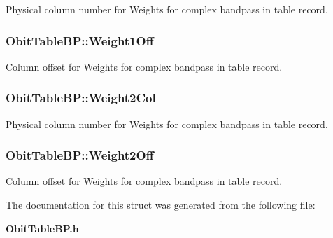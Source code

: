 Physical column number for Weights for complex bandpass in table record. 

\subsubsection{ {\bf Obit\-Table\-BP::Weight1Off}}\label{structObitTableBP_o42}


Column offset for Weights for complex bandpass in table record. 

\subsubsection{ {\bf Obit\-Table\-BP::Weight2Col}}\label{structObitTableBP_o51}


Physical column number for Weights for complex bandpass in table record. 

\subsubsection{ {\bf Obit\-Table\-BP::Weight2Off}}\label{structObitTableBP_o50}


Column offset for Weights for complex bandpass in table record. 



The documentation for this struct was generated from the following file:\begin{CompactItemize}
\item 
{\bf Obit\-Table\-BP.h}\end{CompactItemize}

